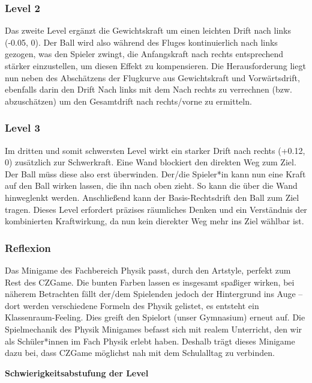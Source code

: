 \subsubsection{Level 2}
Das zweite Level ergänzt die Gewichtskraft um einen leichten Drift nach links (-0.05, 0).
Der Ball wird also während des Fluges kontinuierlich nach links gezogen, was den Spieler zwingt, die Anfangskraft nach rechts entsprechend stärker einzustellen, um diesen Effekt zu kompensieren.
Die Herausforderung liegt nun neben des Abschätzens der Flugkurve aus Gewichtskraft und Vorwärtsdrift, ebenfalls darin den Drift Nach links mit dem Nach rechts zu verrechnen (bzw. abzuschätzen) um den Gesamtdrift nach rechts/vorne zu ermitteln.

\subsubsection{Level 3}
Im dritten und somit schwersten Level wirkt ein starker Drift nach rechts (+0.12, 0) zusätzlich zur Schwerkraft.
Eine Wand blockiert den direkten Weg zum Ziel. Der Ball müss diese also erst überwinden.
Der/die Spieler*in kann nun eine Kraft auf den Ball wirken lassen, die ihn nach oben zieht. So kann die über die Wand hinweglenkt werden. Anschließend kann der Basis-Rechtsdrift den Ball zum Ziel tragen.
Dieses Level erfordert präzises räumliches Denken und ein Verständnis der kombinierten Kraftwirkung, da nun kein dierekter Weg mehr ins Ziel wählbar ist.

\subsubsection{Reflexion}

Das Minigame des Fachbereich Physik passt, durch den Artstyle, perfekt zum Rest des CZGame. Die bunten Farben lassen es insgesamt spaßiger wirken, bei näherem Betrachten fällt der/dem Spielenden jedoch der Hintergrund ins Auge – dort werden verschiedene Formeln des Physik gelistet, es entsteht ein Klassenraum-Feeling. Dies greift den Spielort (unser Gymnasium) erneut auf.
Die Spielmechanik des Physik Minigames befasst sich mit realem Unterricht, den wir als Schüler*innen im Fach Physik erlebt haben. Deshalb trägt dieses Minigame dazu bei, dass CZGame möglichst nah mit dem Schulalltag zu verbinden.

\textbf{Schwierigkeitsabstufung der Level} \\


